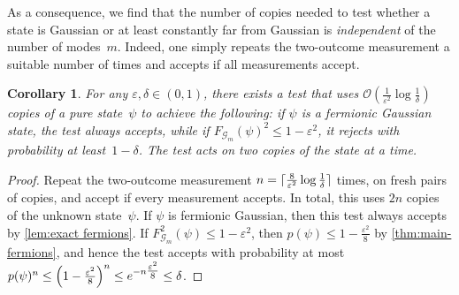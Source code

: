 \documentclass[11pt,a4paper]{article}
\newtheorem{corollary}[theorem]{Corollary}\AddToHook{env/corollary/begin}{\crefalias{theorem}{corollary}}
\numberwithin{equation}{section}
\newcommand{\eps}{\varepsilon}
\newcommand{\bigO}{\mathcal O}
\newcommand{\GG}{\mathcal G}
\newcommand{\1}{\mathbf{1}}
\DeclarePairedDelimiter\ceil{\lceil}{\rceil}
\DeclarePairedDelimiter\parens{\lparen}{\rparen}
\begin{document}
As a consequence, we find that the number of copies needed to test whether a state is Gaussian or at least constantly far from Gaussian is \emph{independent} of the number of modes~$m$.
Indeed, one simply repeats the two-outcome measurement a suitable number of times and accepts if all measurements accept.

\begin{corollary}\label{cor:fermion-testing}
For any $\eps,\delta\in(0,1)$, there exists a test that uses $\bigO(\frac1{\eps^2} \log \frac1\delta)$ copies of a pure state~$\psi$ to achieve the following:
if $\psi$ is a fermionic Gaussian state, the test always accepts, while if $F_{\GG_m}(\psi)^2 \leq 1-\eps^2$, it rejects with probability at least~$1-\delta$.
The test acts on two copies of the state at a time.
\end{corollary}
\begin{proof}
Repeat the two-outcome measurement $n = \ceil{\frac8{\eps^2}\log\frac1\delta}$ times, on fresh pairs of copies, and accept if every measurement accepts.
In total, this uses $2n$ copies of the unknown state~$\psi$.
If $\psi$ is fermionic Gaussian, then this test always accepts by \cref{lem:exact fermions}.
If $F^2_{\GG_m}(\psi) \leq 1 - \eps^2$, then $p(\psi) \leq 1 - \frac{\eps^2}8$ by \cref{thm:main-fermions}, and hence the test accepts with probability at most
$p(\psi)^n \leq \parens*{ 1 - \tfrac{\eps^2}8 }^n \leq e^{-n\tfrac{\eps^2}8} \leq \delta$.
\end{proof}

\end{document}
